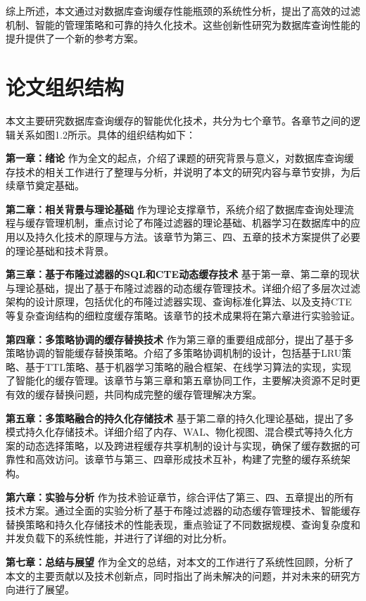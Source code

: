 综上所述，本文通过对数据库查询缓存性能瓶颈的系统性分析，提出了高效的过滤机制、智能的管理策略和可靠的持久化技术。这些创新性研究为数据库查询性能的提升提供了一个新的参考方案。

\section{论文组织结构}

本文主要研究数据库查询缓存的智能优化技术，共分为七个章节。各章节之间的逻辑关系如图1.2所示。具体的组织结构如下：

\textbf{第一章：绪论}
作为全文的起点，介绍了课题的研究背景与意义，对数据库查询缓存技术的相关工作进行了整理与分析，并说明了本文的研究内容与章节安排，为后续章节奠定基础。

\textbf{第二章：相关背景与理论基础}
作为理论支撑章节，系统介绍了数据库查询处理流程与缓存管理机制，重点讨论了布隆过滤器的理论基础、机器学习在数据库中的应用以及持久化技术的原理与方法。该章节为第三、四、五章的技术方案提供了必要的理论基础和技术背景。

\textbf{第三章：基于布隆过滤器的SQL和CTE动态缓存技术}
基于第一章、第二章的现状与理论基础，提出了基于布隆过滤器的动态缓存管理技术。详细介绍了多层次过滤架构的设计原理，包括优化的布隆过滤器实现、查询标准化算法、以及支持CTE等复杂查询结构的细粒度缓存策略。该章节的技术成果将在第六章进行实验验证。

\textbf{第四章：多策略协调的缓存替换技术}
作为第三章的重要组成部分，提出了基于多策略协调的智能缓存替换策略。介绍了多策略协调机制的设计，包括基于LRU策略、基于TTL策略、基于机器学习策略的融合框架、在线学习算法的实现，实现了智能化的缓存管理。该章节与第三章和第五章协同工作，主要解决资源不足时更有效的缓存替换问题，共同构成完整的缓存管理解决方案。

\textbf{第五章：多策略融合的持久化存储技术}
基于第二章的持久化理论基础，提出了多模式持久化存储技术。详细介绍了内存、WAL、物化视图、混合模式等持久化方案的动态选择策略，以及跨进程缓存共享机制的设计与实现，确保了缓存数据的可靠性和高效访问。该章节与第三、四章形成技术互补，构建了完整的缓存系统架构。

\textbf{第六章：实验与分析}
作为技术验证章节，综合评估了第三、四、五章提出的所有技术方案。通过全面的实验分析了基于布隆过滤器的动态缓存管理技术、智能缓存替换策略和持久化存储技术的性能表现，重点验证了不同数据规模、查询复杂度和并发负载下的系统性能，并进行了详细的对比分析。

\textbf{第七章：总结与展望}
作为全文的总结，对本文的工作进行了系统性回顾，分析了本文的主要贡献以及技术创新点，同时指出了尚未解决的问题，并对未来的研究方向进行了展望。
